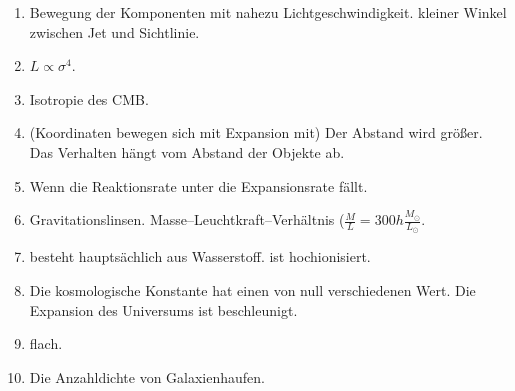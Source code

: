\documentclass[a4paper,12pt]{article}
\numberwithin{equation}{section}
\begin{document}
\begin{enumerate}[label=\arabic*.]
        \item Bewegung der Komponenten mit nahezu Lichtgeschwindigkeit. kleiner Winkel zwischen Jet und Sichtlinie.
        \item $L\propto \sigma ^4$.
        \item Isotropie des CMB. 
        \item (Koordinaten bewegen sich mit Expansion mit) Der Abstand wird größer. Das Verhalten hängt vom Abstand der Objekte ab.
        \item Wenn die Reaktionsrate unter die Expansionsrate fällt.
        \item Gravitationslinsen. Masse--Leuchtkraft--Verhältnis ($\tfrac{M}{L}=300h\tfrac{M_\odot}{L_\odot}$. 
        \item besteht hauptsächlich aus Wasserstoff. ist hochionisiert.
        \item Die kosmologische Konstante hat einen von null verschiedenen Wert. Die Expansion des Universums ist beschleunigt.
        \item flach.
        \item Die Anzahldichte von Galaxienhaufen.
\end{enumerate}


\newpage

\end{document}
